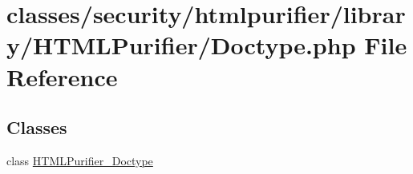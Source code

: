 \hypertarget{Doctype_8php}{\section{classes/security/htmlpurifier/library/\+H\+T\+M\+L\+Purifier/\+Doctype.php File Reference}
\label{Doctype_8php}
}
\subsection*{Classes}
\begin{DoxyCompactItemize}
\item 
class \hyperlink{classHTMLPurifier__Doctype}{H\+T\+M\+L\+Purifier\+\_\+\+Doctype}
\end{DoxyCompactItemize}
